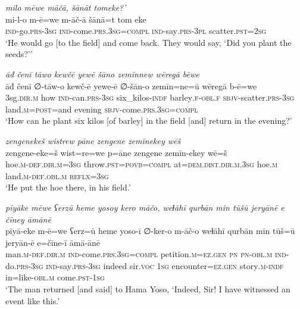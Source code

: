 \ea \label{ŽP.39}
\textit{milo mēwe māčā, šānāt tomeke?’} \\ 
\gll mi-l-o m-ē=we m-āč-ā šānā=t tom eke \\ 
 \textsc{ind-}go\textsc{.prs}\textsc{-3sg} \textsc{ind-}come\textsc{.prs}\textsc{.3sg}\textsc{=compl} \textsc{ind-}say\textsc{.prs}\textsc{-3pl} scatter\textsc{.pst}\textsc{=\textsc{2sg}} \\ 
\glt `He would go [to the field] and come back. They would say, ‘Did you plant the seeds?’'
\z 
 
\ea \label{ŽP.46}
\textit{āđ čenī tāwo kewčē yewē šāno zemīnnew wēregā bēwe} \\ 
\gll āđ čenī ∅-tāw-o kewč-ē yewe-ē ∅-šān-o zemīn=ne=ū wēregā b-ē=we \\ 
 3sg\textsc{.dir}\textsc{.m} how \textsc{ind-}can\textsc{.prs}\textsc{-3sg} six\_kilos\textsc{-indf} barley\textsc{.f}\textsc{-obl}\textsc{.f} \textsc{sbjv-}scatter\textsc{.prs}\textsc{-3sg} land\textsc{.m}\textsc{=\textsc{post}}=and evening \textsc{sbjv-}come\textsc{.prs}\textsc{.3sg}\textsc{=compl} \\ 
\glt `How can he plant six kilos [of barley] in the field [and] return in the evening?'
\z 
 
\ea \label{ŽP.52}
\textit{zengenekeš wistrew pāne zengene zemīnekey wēš} \\ 
\gll zengene-eke=š wist=re=we p=āne zengene zemīn-ekey wē=š \\ 
 hoe\textsc{.m}\textsc{-def}\textsc{.dir}\textsc{.m}\textsc{=3sg} throw\textsc{.pst}\textsc{=\textsc{povb}}\textsc{=compl} at=\textsc{dem.dist}\textsc{.dir}\textsc{.m}\textsc{.3sg} hoe\textsc{.m} land\textsc{.m}\textsc{-def}\textsc{.obl}\textsc{.m} \textsc{reflx}\textsc{=3sg} \\ 
\glt `He put the hoe there, in his field.'
\z 
 
\ea \label{ŽP.57}
\textit{pīyāke mēwe ʕerzū heme yosoy kero māčo, weɫāhī qurbān min tūšū jeryānē e čīney āmānē} \\ 
\gll pīyā-eke m-ē=we ʕerz=ū heme yoso-ī ∅-ker-o m-āč-o weɫāhī qurbān min tūš=ū jeryān-ē e=čīne-ī āmā-ānē \\ 
 man\textsc{.m}\textsc{-def}\textsc{.dir}\textsc{.m} \textsc{ind-}come\textsc{.prs}\textsc{.3sg}\textsc{=compl} petition\textsc{.m}\textsc{\textsc{=ez.gen}} \textsc{pn} \textsc{pn}\textsc{-obl}\textsc{.m} \textsc{ind-}do\textsc{.prs}\textsc{-3sg} \textsc{ind-}say\textsc{.prs}\textsc{-3sg} indeed sir.\textsc{voc} \textsc{1sg} encounter\textsc{\textsc{=ez.gen}} story\textsc{.m}\textsc{-indf} in=like\textsc{-obl}\textsc{.m} come\textsc{.pst}\textsc{-\textsc{1sg}} \\ 
\glt `The man returned [and said] to Hama Yoso, ‘Indeed, Sir! I have witnessed an event like this.'
\z 
 

